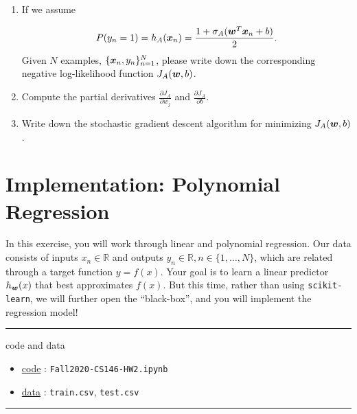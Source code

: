 \documentclass[11pt]{article}
\begin{document}
\begin{enumerate}
\begin{enumerate}
\solution{}

\item If we assume 

\begin{equation*}
    P(y_n = 1) = h_A(\boldsymbol{x}_n) = \frac{1+\sigma_A(\boldsymbol{w}^T\boldsymbol{x}_n+b)}{2}.
\end{equation*}
Given $N$ examples, $\{\boldsymbol{x}_n, y_n\}_{n=1}^N$,
please write down the corresponding negative log-likelihood function $J_A(\boldsymbol{w}, b)$. 

\solution{}

\item Compute the partial derivatives  $\frac{\partial J_A}{\partial w_j}$ and $\frac{\partial J_A}{\partial b}$. 

\solution{}

\item Write down the stochastic gradient descent algorithm for minimizing $J_A(\boldsymbol{w}, b)$.  

\solution{}
\end{enumerate}

\end{enumerate}



\newpage
\section{Implementation: Polynomial Regression }

In this exercise, you will work through linear and polynomial regression. Our data consists of inputs $x_n \in \mathbb{R}$ and outputs $y_n \in \mathbb{R}, n \in \{1,\ldots,N\}$, which are related through a target function $y = f(x)$. Your goal is to learn a linear predictor $h_{\boldsymbol{w}}(x)$ that best approximates $f(x)$. But this time, rather than using \verb|scikit-learn|, we will further open the ``black-box'', and you will implement the regression model!

\rule{\textwidth}{1pt}
code and data
\begin{itemize}[nolistsep]
\item \href{https://colab.research.google.com/drive/1fl_SOlAx2dLOF6wV8rO24wq3Nd0vT4_x?usp=sharing}{code} : \verb|Fall2020-CS146-HW2.ipynb|
\item \href{https://drive.google.com/drive/folders/1VyQwXI5Fi05UvwyuTdwQjVevYJzVWqLv?usp=sharing}{data} : \verb|train.csv|, \verb|test.csv|
\end{itemize}
\vspace{-\baselineskip}
\rule{\textwidth}{1pt}
\end{document}
